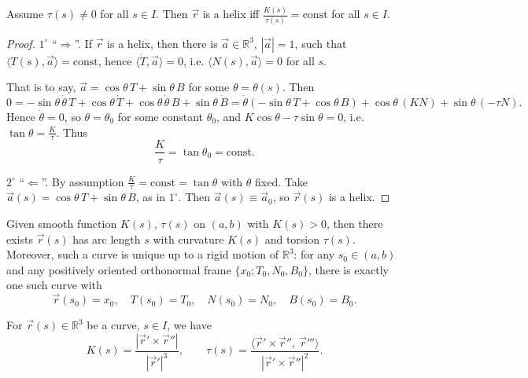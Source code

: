 \begin{lemma}\label{lem:helix-ratio}
Assume $\tau(s)\neq0$ for all $s\in I$. Then $\vec r$ is a helix iff $\frac{K(s)}{\tau(s)}=\text{const}$ for all $s\in I$.
\end{lemma}

\begin{proof}
$1^\circ$ ``$\Longrightarrow$''. If $\vec r$ is a helix, then there is $\vec a\in\mathbb{R}^3$, $|\vec a|=1$, such that $\langle T(s),\vec a\rangle=\text{const}$, hence $\langle\dot T,\vec a\rangle=0$, i.e. $\langle N(s),\vec a\rangle=0$ for all $s$.

That is to say, $\vec a=\cos\theta\,T+\sin\theta\,B$ for some $\theta=\theta(s)$. Then
\[
  0=-\sin\theta\,\dot\theta\,T+\cos\theta\,\dot T+\cos\theta\,\dot\theta\,B+\sin\theta\,\dot B
  =\dot\theta(-\sin\theta\,T+\cos\theta\,B)+\cos\theta\,(KN)+\sin\theta\,(-\tau N).
\]
Hence $\dot\theta=0$, so $\theta=\theta_0$ for some constant $\theta_0$, and $K\cos\theta-\tau\sin\theta=0$, i.e. $\tan\theta=\frac{K}{\tau}$. Thus
\[
  \frac{K}{\tau}=\tan\theta_0=\text{const}.
\]

$2^\circ$ ``$\Longleftarrow$''. By assumption $\frac{K}{\tau}=\text{const}=\tan\theta$ with $\theta$ fixed. Take $\vec a(s)=\cos\theta\,T+\sin\theta\,B$, as in $1^\circ$. Then $\vec a(s)\equiv\vec a_0$, so $\vec r(s)$ is a helix.
\end{proof}

\begin{theorem}\label{thm:fundamental}
Given smooth function $K(s)$, $\tau(s)$ on $(a,b)$ with $K(s)>0$, then there exists $\vec r(s)$ has arc length $s$ with curvature $K(s)$ and torsion $\tau(s)$. Moreover, such a curve is unique up to a rigid motion of $\mathbb{R}^3$: for any $s_0\in(a,b)$ and any positively oriented orthonormal frame $\{x_0;T_0,N_0,B_0\}$, there is exactly one such curve with
\[
  \vec r(s_0)=x_0,\quad T(s_0)=T_0,\quad N(s_0)=N_0,\quad B(s_0)=B_0 .
\]
\end{theorem}

\begin{exercise}\label{exe:curvature-torsion}
For $\vec r(s)\in\mathbb{R}^3$ be a curve, $s\in I$, we have
\[
  K(s)=\frac{|\vec r'\times\vec r''|}{|\vec r'|^3},
  \qquad
  \tau(s)=\frac{\bigl\langle\vec r'\times\vec r'',\ \vec r'''\bigr\rangle}{|\vec r'\times\vec r''|^2}.
\]
\end{exercise}
